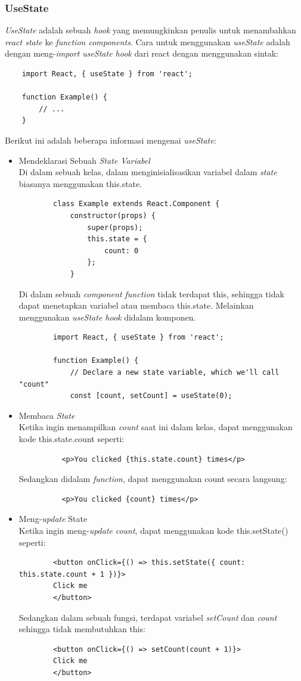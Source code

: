 \subsubsection{UseState}
\textit{UseState} adalah sebuah \textit{hook} yang memungkinkan penulis untuk menambahkan \textit{react state} ke \textit{function components}. Cara untuk menggunakan \textit{useState} adalah dengan meng-\textit{import} \textit{useState hook} dari react dengan menggunakan sintak:
\begin{verbatim}
	import React, { useState } from 'react';
	
	function Example() {
		// ...
	}
\end{verbatim}
Berikut ini adalah beberapa informasi mengenai \textit{useState}:
\begin{itemize}
	\item Mendeklarasi Sebuah \textit{State Variabel}\\
	Di dalam sebuah kelas, dalam menginisialisasikan variabel dalam \textit{state} biasanya menggunakan this.state. 
	\begin{lstlisting}
		class Example extends React.Component {
			constructor(props) {
				super(props);
				this.state = {
					count: 0
				};
			}
		\end{lstlisting}
	Di dalam sebuah \textit{component function} tidak terdapat this, sehingga tidak dapat menetapkan variabel atau membaca this.state. Melainkan menggunakan \textit{useState hook} didalam komponen.
	\begin{lstlisting}
		import React, { useState } from 'react';
		
		function Example() {
			// Declare a new state variable, which we'll call "count"
			const [count, setCount] = useState(0);
		\end{lstlisting}
	
	\item Membaca \textit{State}\\
	Ketika ingin menampilkan \textit{count} saat ini dalam kelas, dapat menggunakan kode this.state.count seperti:
	\begin{verbatim}
		  <p>You clicked {this.state.count} times</p>
	\end{verbatim}
	Sedangkan didalam \textit{function}, dapat menggunakan count secara langsung:
	\begin{verbatim}
		  <p>You clicked {count} times</p>
	\end{verbatim}
	
	\item Meng-\textit{update} State\\
	Ketika ingin meng-\textit{update} \textit{count}, dapat menggunakan kode this.setState() seperti:
	\begin{verbatim}
		<button onClick={() => this.setState({ count: this.state.count + 1 })}>
		Click me
		</button>
	\end{verbatim}
	Sedangkan dalam sebuah fungsi, terdapat variabel \textit{setCount} dan \textit{count} sehingga tidak membutuhkan this:
	\begin{verbatim}
		<button onClick={() => setCount(count + 1)}>
		Click me
		</button>
	\end{verbatim}
\end{itemize}
